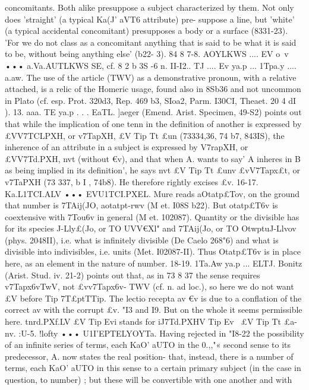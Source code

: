 {{{{{{{{{{{{{{{{{{{{{{{{{{{{{{concomitants. Both alike presuppose a subject characterized by
them. Not only does 'straight' (a typical Ka(J' aVT6 attribute) pre-
suppose a line, but 'white' (a typical accidental concomitant)
presupposes a body or a surface (8331-23). 'For we do not class
as a concomitant anything that is said to be what it is said to be,
without being anything else' (b22- 3).
84 8 7-8. AOYLKWS .... EV o~v ••• a.Va.AUTLKWS SE, cf. 8 2 b 3S -6 n.
II-I2.. TJ .... Ev ya.p ... 1Tpa.y .... a.aw. The use of the article (TWV)
as a demonstrative pronoun, with a relative attached, is a relic
of the Homeric usage, found also in 8Sb36 and not uncommon in
Plato (cf. esp. Prot. 320d3, Rep. 469 b3, SIoa2, Parm. I30CI,
Theaet. 20 4 dI ).
13. aaa. TE ya.p . . . EaTL. ]aeger (Emend. Arist. Specimen,
49-S2) points out that while the implication of one tenn in the
definition of another is expressed by £VV7TCLPXH, or v7TapXH, £V Tip
Tt £un (73334,36, 74 b7, 843IS), the inherence of an attribute in a
subject is expressed by V7rapXH, or £VV7Td.PXH, nvt (without €v),
and that when A. wants to say' A inheres in B as being implied
in its definition', he says nvt £V Tip Tt £unv £vV7Tapx£t, or v7TaPXH
(73 337, b I , 74b8). He therefore rightly excises £v.
16-17. Ka.L1TCI.ALV ••• EVU1TCI.PXEL. Mure reads aOtatp£Tov, on the
ground that number is 7TAij(JO, aotatpt-rwv (M et. I08S b22). But
otatp£T6v is coextensive with 7Tou6v in general (M et. 102087).
Quantity or the divisible has for its species J-Lly£(Jo, or TO UVV€Xl"
and 7TAij(Jo, or TO OtwptuJ-Llvov (phys. 2048II), i.e. what is infinitely
divisible (De Caelo 268"6) and what is divisible into indivisibles,
i.e. units (Met. I02087-II). Thus Otatp£T6v is in place here, as an
element in the nature of number.
18-19. 1Ta.Aw ya.p ... ELTJ. Bonitz (Arist. Stud. iv. 21-2) points
out that, as in 73 8 37 the sense requires v7Tapx6vTwV, not £vv7Tapx6v-
TWV (cf. n. ad loc.), so here we do not want £V before Tip 7T£ptTTip.
The lectio recepta av €v is due to a conflation of the correct av
with the corrupt £v.%
"I3 and I9. But on the whole it seems permissible here. tnrd.PXf.LV
£V Tip Evi stands for iJ7Td.PXHV Tip Ev~ £V Tip Tt £a-nv.
:U-5.
!lofty ••• U1I'EPTELYOYTa. Having rejected in "I8-22
the possibility of an infinite series of terms, each KaO' aUTO in the
0.,,"«
second sense to its predecessor, A. now states the real position-
that, instead, there is a number of terms, each KaO' aUTO in this
sense to a certain primary subject (in the case in question, to
number) ; but these will be convertible with one another and with
}}}}}}}}}}}}}}}}}}}}}}}}}}}}}}
